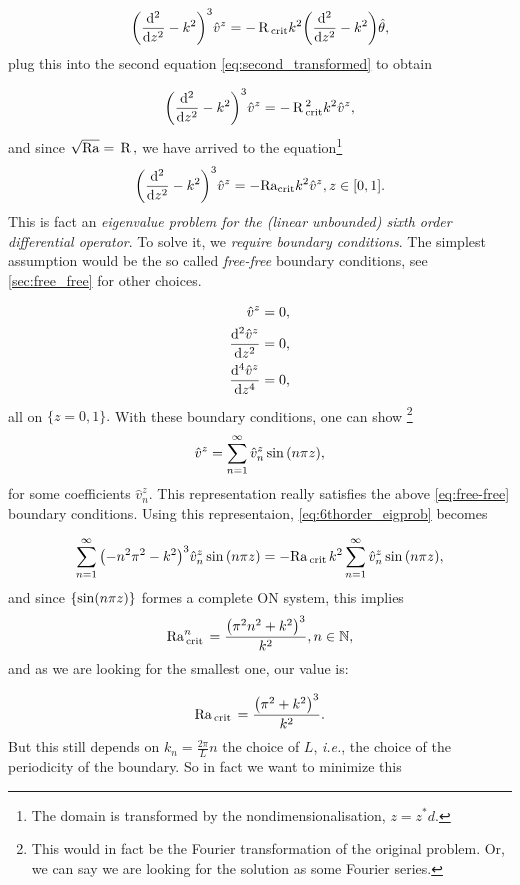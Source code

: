 \documentclass[../main.tex]{subfiles}
\begin{document}
\[
	\qty(\dv[2]{z} - k^{2})^{3}\hat{v}^z = -\, \text{R} \,_{\text{crit}} k^{2} \qty(\dv[2]{z}-k^{2})\hat{\theta},
\]
plug this into the second equation \ref{eq:second_transformed} to obtain

\[
	\qty(\dv[2]{z} - k^{2})^{3}\hat{v}^z = - \, \text{R} \,^{2}_{\text{crit}} k^{2} \hat{v}^z,
\]
and since $\sqrt{\mathrm{Ra}} = \, \text{R} \,,$ we have arrived to the equation\footnote{The domain is transformed by the nondimensionalisation, $z = z^{*} d$.}
\begin{equation}
	\label{eq:6thorder_eigprob}
	\qty(\dv[2]{z}-k^{2})^{3}\hat{v}^z = - \mathrm{Ra}_{\text{crit}} k^{2} \hat{v}^z, z \in [0,1].
\end{equation}
This is fact an \textit{eigenvalue problem for the (linear unbounded) sixth order differential operator}. To solve it, we \textit{require boundary conditions}. The simplest assumption would be the so called \textit{free-free} boundary conditions, see \ref{sec:free_free} for other choices.

\begin{align}
	\label{eq:free-free}
	\hat{v}^{z} &= 0, \\
	\dv[2]{\hat{v}^{z}}{z} &= 0,\\
	\dv[4]{\hat{v}^{z}}{z} &= 0,
\end{align}
all on $\{z = 0,1\}.$ With these boundary conditions, one can show \footnote{This would in fact be the Fourier transformation of the original problem. Or, we can say we are looking for the solution as some Fourier series.}
\[
	\hat{v}^{z} = \sum_{n=1}^{\infty}\hat{v}_n^{z}\sin\qty(n \pi z),
\]
for some coefficients $\hat{v}_n^{z}.$ This representation really satisfies the above \ref{eq:free-free} boundary conditions. Using this representaion, \ref{eq:6thorder_eigprob} becomes

\[
	\sum_{n=1}^{\infty}\qty(-n^{2} \pi^{2} - k^{2})^{3}\hat{v}^{z}_n \sin\qty(n \pi z) = -\mathrm{Ra}_{\, \text{crit} \,}k^{2} \sum_{n=1}^\infty \hat{v}^{z}_n \sin\qty(n \pi z),
\]
and since $\qty{\sin(n \pi z)}$ formes a complete ON system, this implies 
\[
	\mathrm{Ra}^n_{\, \text{crit} \,} = \frac{\qty(\pi^{2}n^{2}+k^{2})^{3}}{k^{2}}, n \in {\mathbb N},
\]
and as we are looking for the smallest one, our value is:

\[
	\mathrm{Ra}_{\, \text{crit} \,} = \frac{\qty(\pi^{2}+k^{2})^{3}}{k^{2}}.
\]
But this still depends on $k_n = \frac{2 \pi}{L}n$ the choice of $L$, \textit{i.e.}, the choice of the periodicity of the boundary. So in fact we want to minimize this
\end{document}
